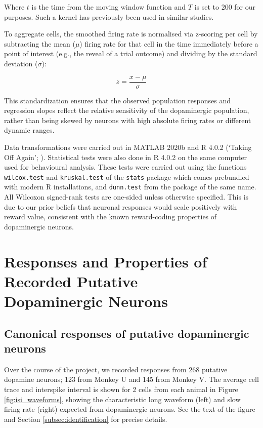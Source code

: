 Where $t$ is the time from the moving window function and $T$ is set to 200 for our purposes. Such a kernel has previously been used \cite{eshelDopamineNeuronsShare2016} in similar studies. 

To aggregate cells, the smoothed firing rate is normalised via z-scoring per cell by subtracting the mean ($\mu$) firing rate for that cell in the time immediately before a point of interest (e.g., the reveal of a trial outcome) and dividing by the standard deviation ($\sigma$):

\begin{equation}
    z = \frac{x - \mu}{\sigma}
    \label{eq:z-smooth}
\end{equation}

This standardization ensures that the observed population responses and regression slopes reflect the relative sensitivity of the dopaminergic population, rather than being skewed by neurons with high absolute firing rates or different dynamic ranges.

Data transformations were carried out in MATLAB 2020b and R 4.0.2 (‘Taking Off Again'; \cite{rcore}). Statistical tests were also done in R 4.0.2 on the same computer used for behavioural analysis. These tests were carried out using the functions \texttt{wilcox.test} and \texttt{kruskal.test} of the \texttt{stats} package which comes prebundled with modern R installations, and \texttt{dunn.test} from the package of the same name. All Wilcoxon signed-rank tests are one-sided unless otherwise specified. This is due to our prior beliefs that neuronal responses would scale positively with reward value, consistent with the known reward-coding properties of dopaminergic neurons.

\clearpage
\section[Responses and Properties of Recorded Putative Dopaminergic Neurons]{Responses and Properties of Recorded Putative\\Dopaminergic Neurons}

\subsection{Canonical responses of putative dopaminergic neurons}

Over the course of the project, we recorded responses from 268 putative dopamine neurons; 123 from Monkey U and 145 from Monkey V. The average cell trace and interspike interval is shown for 2 cells from each animal in Figure \ref{fig:isi_waveforms}, showing the characteristic long waveform (left) and slow firing rate (right) expected from dopaminergic neurons. See the text of the figure and Section \ref{subsec:identification} for precise details.

